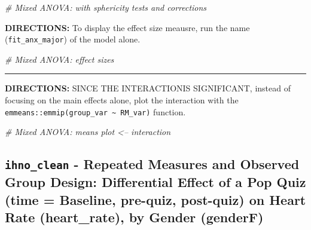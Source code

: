 \documentclass[
]{article}
\newenvironment{Shaded}{\begin{snugshade}}{\end{snugshade}}
\newcommand{\CommentTok}[1]{\textcolor[rgb]{0.56,0.35,0.01}{\textit{#1}}}
\begin{document}
\begin{Shaded}
\begin{Highlighting}[]
\CommentTok{# Mixed ANOVA:  with sphericity tests and corrections}
\end{Highlighting}
\end{Shaded}

\clearpage

\textbf{DIRECTIONS:} To display the effect size meausre, run the name
(\texttt{fit\_anx\_major}) of the model alone.

\begin{Shaded}
\begin{Highlighting}[]
\CommentTok{# Mixed ANOVA: effect sizes }
\end{Highlighting}
\end{Shaded}

\begin{center}\rule{0.5\linewidth}{\linethickness}\end{center}

\textbf{DIRECTIONS:} SINCE THE INTERACTIONIS SIGNIFICANT, instead of
focusing on the main effects alone, plot the interaction with the
\texttt{emmeans::emmip(group\_var\ \textasciitilde{}\ RM\_var)}
function.

\begin{Shaded}
\begin{Highlighting}[]
\CommentTok{# Mixed ANOVA: means plot <-- interaction}
\end{Highlighting}
\end{Shaded}

\clearpage

\hypertarget{ihno_clean---repeated-measures-and-observed-group-design-differential-effect-of-a-pop-quiz-time-baseline-pre-quiz-post-quiz-on-heart-rate-heart_rate-by-gender-genderf}{%
\subsection{\texorpdfstring{\texttt{ihno\_clean} - Repeated Measures and
Observed Group Design: Differential Effect of a Pop Quiz (time =
Baseline, pre-quiz, post-quiz) on Heart Rate (heart\_rate), by Gender
(genderF)}{ihno\_clean - Repeated Measures and Observed Group Design: Differential Effect of a Pop Quiz (time = Baseline, pre-quiz, post-quiz) on Heart Rate (heart\_rate), by Gender (genderF)}}\label{ihno_clean---repeated-measures-and-observed-group-design-differential-effect-of-a-pop-quiz-time-baseline-pre-quiz-post-quiz-on-heart-rate-heart_rate-by-gender-genderf}}
\end{document}
